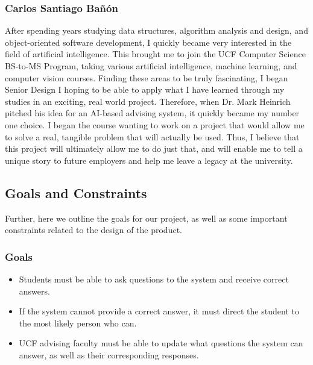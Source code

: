 \documentclass[titlepage, 12pt]{article}
\begin{document}
\subsubsection{Carlos Santiago Bañón}

After spending years studying data structures, algorithm analysis and design, and object-oriented software development, I quickly became very interested in the field of artificial intelligence. This brought me to join the UCF Computer Science BS-to-MS Program, taking various artificial intelligence, machine learning, and computer vision courses. Finding these areas to be truly fascinating, I began Senior Design I hoping to be able to apply what I have learned through my studies in an exciting, real world project. Therefore, when Dr. Mark Heinrich pitched his idea for an AI-based advising system, it quickly became my number one choice. I began the course wanting to work on a project that would allow me to solve a real, tangible problem that will actually be used. Thus, I believe that this project will ultimately allow me to do just that, and will enable me to tell a unique story to future employers and help me leave a legacy at the university.

\subsection{Goals and Constraints}

Further, here we outline the goals for our project, as well as some important constraints related to the design of the product.

\subsubsection{Goals}

\begin{itemize}
  \item Students must be able to ask questions to the system and receive correct answers.
  \item If the system cannot provide a correct answer, it must direct the student to the most likely person who can.
  \item UCF advising faculty must be able to update what questions the system can answer, as well as their corresponding responses.
\end{itemize}

\end{document}
